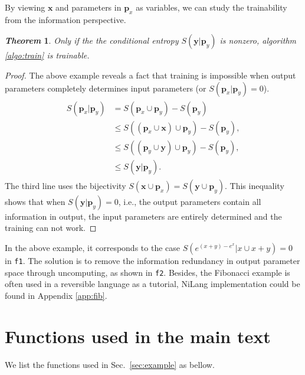 \documentclass{article}
\newcommand{\<}{\langle}
\renewcommand{\>}{\rangle}
\newcommand{\vx}{{\mathbf{x}}}
\newcommand{\vp}{{\mathbf{p}}}
\newcommand{\vy}{{\mathbf{y}}}
\newcommand{\Sec}[1]{Sec.~\ref{#1}}
\newcommand{\App}[1]{Appendix \ref{#1}}
\newtheorem{theorem}{\textit{Theorem}}
\theoremstyle{definition}\newtheorem{definition}{\textit{Definition}}
\begin{document}
By viewing $\vx$ and parameters in $\vp_x$ as variables, we can study the trainability from the information perspective.
\begin{theorem}
    Only if the the conditional entropy $S(\vy|\vp_y)$ is nonzero, algorithm \ref{algo:train} is trainable.
\end{theorem}
\begin{proof}
The above example reveals a fact that training is impossible when output parameters completely determines input parameters (or $S(\vp_x | \vp_y) = 0$).
\begin{align}
    \begin{split}
        S(\vp_x | \vp_y) &= S(\vp_x \cup \vp_y) - S(\vp_y)\\
        &\leq S\left((\vp_x \cup \vx) \cup \vp_y \right) - S(\vp_y),\\
        &\leq S\left((\vp_y \cup \vy) \cup \vp_y\right) - S(\vp_y),\\
    &\leq S(\vy|\vp_y).
    \end{split}
\end{align}
The third line uses the bijectivity $S(\vx \cup \vp_x) = S(\vy \cup \vp_y)$.
This inequality shows that when $S(\vy | \vp_y) = 0$, i.e., the output parameters contain all information in output, the input parameters are entirely determined and the training can not work.
\end{proof}
In the above example, it corresponds to the case $S\left(e^{(x+y)-e^x} | x \cup x + y\right) = 0$ in \texttt{f1}.
The solution is to remove the information redundancy in output parameter space through uncomputing, as shown in \texttt{f2}.
Besides, the Fibonacci example is often used in a reversible language as a tutorial, NiLang implementation could be found in \App{app:fib}.

\section{Functions used in the main text}\label{app:functions}

We list the functions used in \Sec{sec:example} as bellow.
\end{document}
